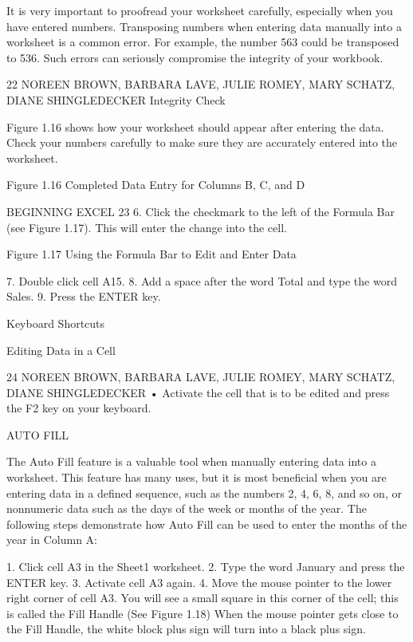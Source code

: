 It is very important to proofread your worksheet carefully, especially when you have entered numbers. Transposing
numbers when entering data manually into a worksheet is a common error. For example, the number 563 could be
transposed to 536. Such errors can seriously compromise the integrity of your workbook.




22 NOREEN BROWN, BARBARA LAVE, JULIE ROMEY, MARY SCHATZ, DIANE SHINGLEDECKER
Integrity Check

Figure 1.16 shows how your worksheet should appear after entering the data. Check your numbers carefully to
make sure they are accurately entered into the worksheet.




Figure 1.16 Completed Data Entry for Columns B, C, and D




BEGINNING EXCEL 23
6. Click the checkmark to the left of the Formula Bar (see Figure 1.17). This will enter the change
into the cell.




Figure 1.17 Using the Formula Bar to Edit and Enter Data




7. Double click cell A15.
8. Add a space after the word Total and type the word Sales.
9. Press the ENTER key.


Keyboard Shortcuts


Editing Data in a Cell




24 NOREEN BROWN, BARBARA LAVE, JULIE ROMEY, MARY SCHATZ, DIANE SHINGLEDECKER
• Activate the cell that is to be edited and press the F2 key on your keyboard.



AUTO FILL

The Auto Fill feature is a valuable tool when manually entering data into a worksheet. This feature
has many uses, but it is most beneficial when you are entering data in a defined sequence, such as the
numbers 2, 4, 6, 8, and so on, or nonnumeric data such as the days of the week or months of the year.
The following steps demonstrate how Auto Fill can be used to enter the months of the year in Column
A:

1.   Click cell A3 in the Sheet1 worksheet.
2.   Type the word January and press the ENTER key.
3.   Activate cell A3 again.
4.   Move the mouse pointer to the lower right corner of cell A3. You will see a small square in this
corner of the cell; this is called the Fill Handle (See Figure 1.18) When the mouse pointer gets
close to the Fill Handle, the white block plus sign will turn into a black plus sign.




